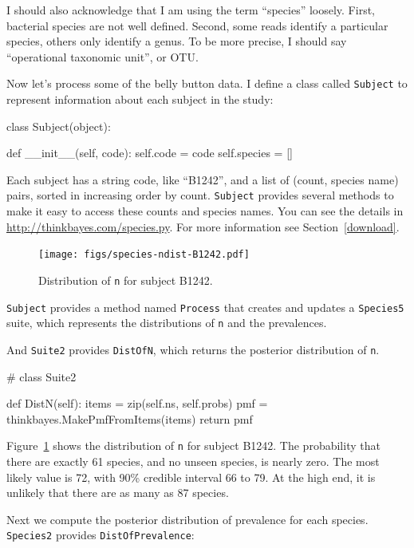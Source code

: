 \documentclass[12pt]{book}
\theoremstyle{exercise}
\newcommand{\py}[1]{{\tt #1}}%
\begin{document}
I should also acknowledge that I am using the term ``species''
loosely.  First, bacterial species are not well defined.  Second,
some reads identify a particular species, others only identify
a genus.  To be more precise, I should say ``operational
taxonomic unit'', or OTU.

Now let's process some of the belly button data.  I define
a class called \py{Subject} to represent information about
each subject in the study:

\begin{code}
class Subject(object):

    def __init__(self, code):
        self.code = code
        self.species = []
\end{code}

Each subject has a string code, like ``B1242'', and a list of
(count, species name) pairs, sorted in increasing order by count.
\py{Subject} provides several methods to make it
easy to access these counts and species names.  You can see the details
in \url{http://thinkbayes.com/species.py}.
  For more information
see Section~\ref{download}.

\begin{figure}
\centerline{\texttt{[image: figs/species-ndist-B1242.pdf]}}
\caption{Distribution of \py{n} for subject B1242.}
\label{species-ndist}
\end{figure}

\py{Subject} provides a method named \py{Process} that creates and
updates a \py{Species5} suite,
which represents the distributions of \py{n} and the prevalences.

And \py{Suite2} provides \py{DistOfN}, which returns the posterior
distribution of \py{n}.

\begin{code}
# class Suite2

    def DistN(self):
        items = zip(self.ns, self.probs)
        pmf = thinkbayes.MakePmfFromItems(items)
        return pmf
\end{code}

Figure~\ref{species-ndist} shows the distribution of \py{n} for
subject B1242.  The probability that there are exactly 61 species, and
no unseen species, is nearly zero.  The most likely value is 72, with
90\% credible interval 66 to 79.  At the high end, it is unlikely that
there are as many as 87 species.

Next we compute the posterior distribution of prevalence for
each species.  \py{Species2} provides \py{DistOfPrevalence}:
\end{document}

